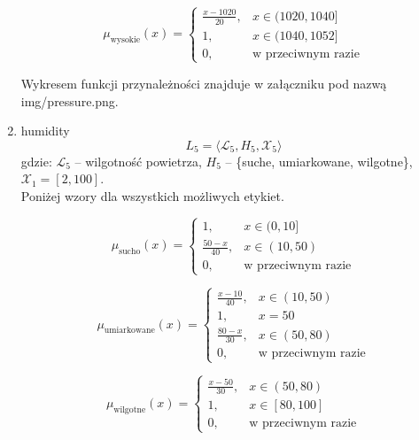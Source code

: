 \documentclass{article}
\begin{document}
\begin{enumerate}
                \begin{equation}
                \mu_{\text{wysokie}}(x) =
                    \begin{cases}
                    \frac{x - 1020}{20}, & x \in (1020, 1040] \\
                    1, & x \in (1040, 1052] \\
                    0, & \text{w przeciwnym razie}
                    \end{cases}
                \end{equation}

Wykresem funkcji przynależności znajduje w załączniku pod nazwą img/pressure.png.
    
    \item humidity
    \begin{equation}
            L_5 = \langle \mathcal{L}_5, H_5, \mathcal{X}_5 \rangle
        \end{equation}
        gdzie: $\mathcal{L}_5$ – wilgotność powietrza, $H_5$ – \{suche, umiarkowane, wilgotne\}, $\mathcal{X}_1 = [2, 100]$. \\
        Poniżej wzory dla wszystkich możliwych etykiet.

        \begin{equation}
        \mu_{\text{sucho}}(x) =
        \begin{cases}
        1, & x \in (0, 10] \\
        \frac{50 - x}{40}, & x \in (10, 50) \\
        0, & \text{w przeciwnym razie}
        \end{cases}
        \end{equation}

        \begin{equation}
        \mu_{\text{umiarkowane}}(x) =
        \begin{cases}
        \frac{x - 10}{40}, & x \in (10, 50) \\
        1, & x = 50 \\
        \frac{80 - x}{30}, & x \in (50, 80) \\
        0, & \text{w przeciwnym razie}
        \end{cases}
        \end{equation}

        \begin{equation}
        \mu_{\text{wilgotne}}(x) =
        \begin{cases}
        \frac{x - 50}{30}, & x \in (50, 80) \\
        1, & x \in [80, 100] \\
        0, & \text{w przeciwnym razie}
        \end{cases}
        \end{equation}


\end{enumerate}
\end{document}
